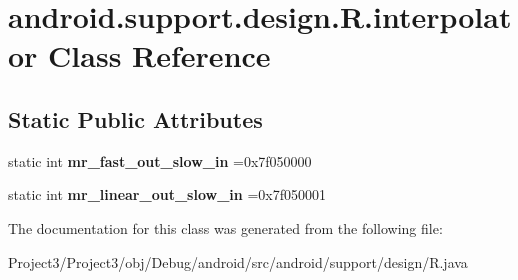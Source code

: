 \hypertarget{classandroid_1_1support_1_1design_1_1R_1_1interpolator}{}\section{android.\+support.\+design.\+R.\+interpolator Class Reference}
\label{classandroid_1_1support_1_1design_1_1R_1_1interpolator}
\subsection*{Static Public Attributes}
\begin{DoxyCompactItemize}
\item 
\mbox{\label{classandroid_1_1support_1_1design_1_1R_1_1interpolator_acab2ce66ba0499d4bab8df45bc9d7ad2}} 
static int {\bfseries mr\+\_\+fast\+\_\+out\+\_\+slow\+\_\+in} =0x7f050000
\item 
\mbox{\label{classandroid_1_1support_1_1design_1_1R_1_1interpolator_a9da9fad0f4747d9a5a53ae631b4aee33}} 
static int {\bfseries mr\+\_\+linear\+\_\+out\+\_\+slow\+\_\+in} =0x7f050001
\end{DoxyCompactItemize}


The documentation for this class was generated from the following file\+:\begin{DoxyCompactItemize}
\item 
Project3/\+Project3/obj/\+Debug/android/src/android/support/design/R.\+java\end{DoxyCompactItemize}
